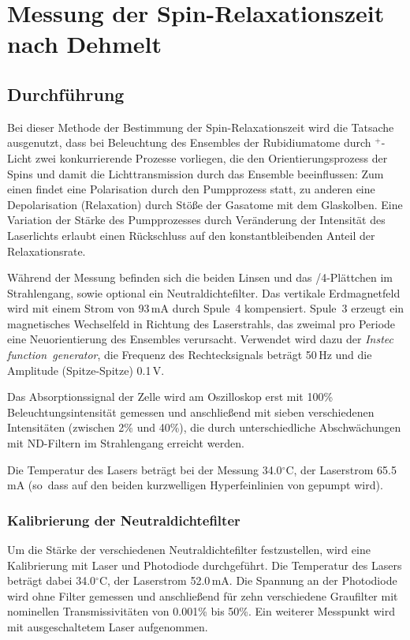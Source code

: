 \section{Messung der Spin-Relaxationszeit nach Dehmelt}
\label{sect:dehmelt}
\subsection{Durchführung}
Bei dieser Methode der Bestimmung der Spin-Relaxationszeit wird die Tatsache ausgenutzt,
dass bei Beleuchtung des Ensembles der Rubidiumatome durch \textsigma$^+$-Licht
zwei konkurrierende Prozesse vorliegen, die den Orientierungsprozess der Spins und damit
die Lichttransmission durch das Ensemble beeinflussen:
Zum einen findet eine Polarisation durch den Pumpprozess statt,
zu anderen eine Depolarisation (Relaxation) durch Stöße der Gasatome mit dem Glaskolben.
Eine Variation der Stärke des Pumpprozesses durch Veränderung der Intensität des Laserlichts
erlaubt einen Rückschluss auf den konstantbleibenden Anteil der Relaxationsrate.

Während der Messung befinden sich die beiden Linsen und das \textlambda/4-Plättchen im Strahlengang,
sowie optional ein Neutraldichtefilter.
Das vertikale Erdmagnetfeld wird mit einem Strom von 93\,mA durch Spule~4 kompensiert.
Spule~3 erzeugt ein magnetisches Wechselfeld in Richtung des Laserstrahls,
das zweimal pro Periode eine Neuorientierung des Ensembles verursacht.
Verwendet wird dazu der \emph{Instec function~generator},
die Frequenz des Rechtecksignals beträgt 50\,Hz und die Amplitude (Spitze-Spitze) 0.1\,V.

Das Absorptionssignal der Zelle wird am Oszilloskop erst mit 100\% Beleuchtungsintensität gemessen
und anschließend mit sieben verschiedenen Intensitäten (zwischen 2\% und 40\%),
die durch unterschiedliche Abschwächungen mit ND-Filtern im Strahlengang erreicht werden.

Die Temperatur des Lasers beträgt bei der Messung 34.0$^\circ$C, der Laserstrom 65.5\,mA
(so~dass auf den beiden kurzwelligen Hyperfeinlinien von  gepumpt wird).







\subsubsection*{Kalibrierung der Neutraldichtefilter}
Um die Stärke der verschiedenen Neutraldichtefilter festzustellen,
wird eine Kalibrierung mit Laser und Photodiode durchgeführt.
Die Temperatur des Lasers beträgt dabei 34.0$^\circ$C, der Laserstrom 52.0\,mA.
Die Spannung an der Photodiode wird ohne Filter gemessen und anschließend für zehn verschiedene Graufilter
mit nominellen Transmissivitäten von 0.001\% bis 50\%.
Ein weiterer Messpunkt wird mit ausgeschaltetem Laser aufgenommen.


